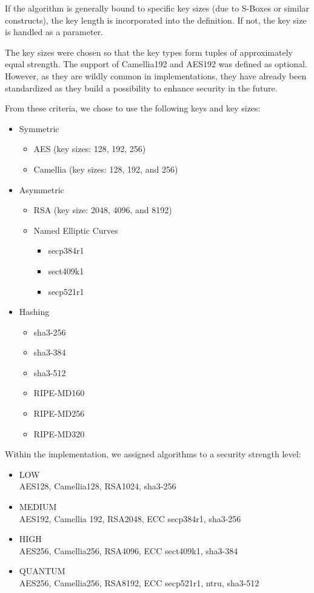 If the algorithm is generally bound to specific key sizes (due to S-Boxes or similar constructs), the key length is incorporated into the definition. If not, the key size is handled as a parameter.

The key sizes were chosen so that the key types form tuples of approximately equal strength. The support of Camellia192 and AES192 was defined as optional. However, as they are wildly common in implementations, they have already been standardized as they build a possibility to enhance security in the future.

From these criteria, we chose to use the following keys and key sizes:
\begin{itemize}
	\item Symmetric
	\begin{itemize}
		\item AES (key sizes: 128, 192, 256)
		\item Camellia (key sizes: 128, 192, and 256)
	\end{itemize}
	\item Asymmetric
	\begin{itemize}
		\item RSA (key size: 2048, 4096, and 8192)
		\item Named Elliptic Curves
		\begin{itemize}
			\item secp384r1
			\item sect409k1
			\item secp521r1
		\end{itemize}
	\end{itemize}
	\item Hashing
	\begin{itemize}
		\item sha3-256
		\item sha3-384
		\item sha3-512
		\item RIPE-MD160
		\item RIPE-MD256
		\item RIPE-MD320
	\end{itemize}
\end{itemize}

Within the implementation, we assigned algorithms to a security strength level:
\begin{itemize}
	\item LOW\\
	AES128, Camellia128, RSA1024, sha3-256
	\item MEDIUM\\
	AES192, Camellia 192, RSA2048, ECC secp384r1, sha3-256
	\item HIGH\\
	AES256, Camellia256, RSA4096, ECC sect409k1, sha3-384
	\item QUANTUM\\
	AES256, Camellia256, RSA8192, ECC secp521r1, ntru, sha3-512
\end{itemize}

